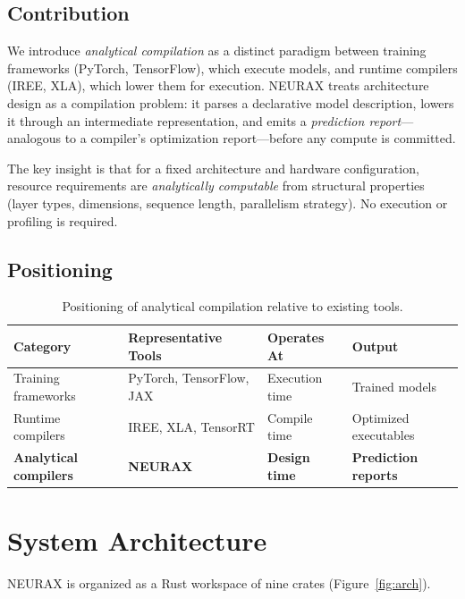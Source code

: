 \documentclass[11pt]{article}
\begin{document}
\subsection{Contribution}

We introduce \emph{analytical compilation} as a distinct paradigm between training frameworks (PyTorch, TensorFlow), which execute models, and runtime compilers (IREE, XLA), which lower them for execution. NEURAX treats architecture design as a compilation problem: it parses a declarative model description, lowers it through an intermediate representation, and emits a \emph{prediction report}---analogous to a compiler's optimization report---before any compute is committed.

The key insight is that for a fixed architecture and hardware configuration, resource requirements are \emph{analytically computable} from structural properties (layer types, dimensions, sequence length, parallelism strategy). No execution or profiling is required.

\subsection{Positioning}

\begin{table}[ht]
\centering
\caption{Positioning of analytical compilation relative to existing tools.}
\begin{tabular}{@{}l l l l@{}}
\toprule
\textbf{Category} & \textbf{Representative Tools} & \textbf{Operates At} & \textbf{Output} \\
\midrule
Training frameworks & PyTorch, TensorFlow, JAX & Execution time & Trained models \\
Runtime compilers & IREE, XLA, TensorRT & Compile time & Optimized executables \\
\textbf{Analytical compilers} & \textbf{NEURAX} & \textbf{Design time} & \textbf{Prediction reports} \\
\bottomrule
\end{tabular}
\end{table}

\section{System Architecture}

NEURAX is organized as a Rust workspace of nine crates (Figure~\ref{fig:arch}).
\end{document}
